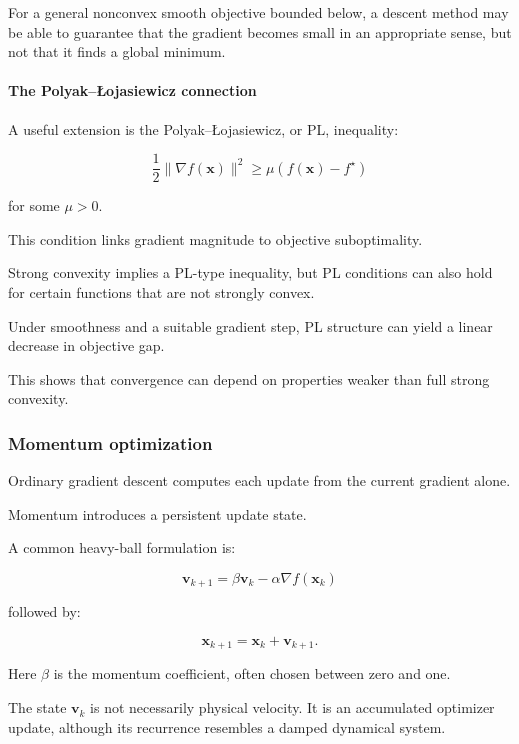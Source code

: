For a general nonconvex smooth objective bounded below, a descent method may be able to guarantee that the gradient becomes small in an appropriate sense, but not that it finds a global minimum.

\paragraph{The Polyak--Łojasiewicz connection}\label{02-foundations-ii-ch026-the-polyakux142ojasiewicz-connection}

\hypertarget{02-foundations-ii-ch026-the-polyakłojasiewicz-connection}{}

A useful extension is the Polyak--Łojasiewicz, or PL, inequality:

\[
\frac12\|\nabla f(\mathbf x)\|^2 \ge \mu(f(\mathbf x)-f^\star)
\]

for some \(\mu>0\).

This condition links gradient magnitude to objective suboptimality.

Strong convexity implies a PL-type inequality, but PL conditions can also hold for certain functions that are not strongly convex.

Under smoothness and a suitable gradient step, PL structure can yield a linear decrease in objective gap.

This shows that convergence can depend on properties weaker than full strong convexity.

\subsubsection{Momentum optimization}\label{02-foundations-ii-ch026-momentum-optimization}

\hypertarget{02-foundations-ii-ch026-momentum-optimization}{}

Ordinary gradient descent computes each update from the current gradient alone.

Momentum introduces a persistent update state.

A common heavy-ball formulation is:

\[
\boxed{ \mathbf v_{k+1} = \beta\mathbf v_k-\alpha\nabla f(\mathbf x_k) }
\]

followed by:

\[
\boxed{ \mathbf x_{k+1}=\mathbf x_k+\mathbf v_{k+1} }.
\]

Here \(\beta\) is the momentum coefficient, often chosen between zero and one.

The state \(\mathbf v_k\) is not necessarily physical velocity. It is an accumulated optimizer update, although its recurrence resembles a damped dynamical system.

